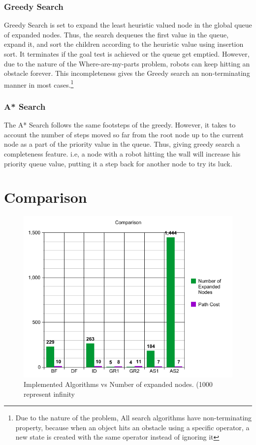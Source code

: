 \subsubsection{Greedy Search}
Greedy Search is set to expand the least heuristic valued node in the global queue of expanded nodes. Thus, the search dequeues the first value in the queue, expand it, and sort the children according to the heuristic value using insertion sort. It terminates if the goal test is achieved or the queue get emptied. However, due to the nature of the Where-are-my-parts problem, robots can keep hitting an obstacle forever. This incompleteness gives the Greedy search an non-terminating manner in most cases.\footnote{Due to the nature of the problem, All search algorithms have non-terminating property, because when an object hits an obstacle using a specific operator, a new state is created with the same operator instead of ignoring it}

\subsubsection{A* Search}
The A* Search follows the same footsteps of the greedy. However, it takes to account the number of steps moved so far from the root node up to the current node as a part of the priority value in the queue. Thus, giving greedy search a completeness feature. i.e, a node with a robot hitting the wall will increase his priority queue value, putting it a step back for another node to try its luck.

\newpage
\section{Comparison}
\begin{figure}[H] 
   	\centering
	\includegraphics[scale=0.6]{images/Graph} 
    \caption{Implemented Algorithms vs Number of expanded nodes. (1000 represent infinity}
    \label{fig:graph} 
\end{figure}

